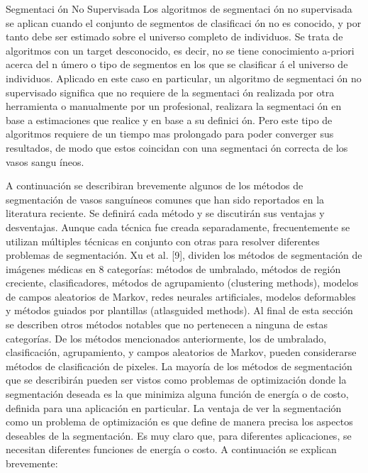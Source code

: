 Segmentaci \'on No Supervisada
Los algoritmos de segmentaci \'on no supervisada se aplican cuando el conjunto de segmentos de clasificaci \'on no es conocido, y por tanto debe ser estimado sobre el universo completo de individuos. Se trata de algoritmos con un target desconocido, es decir, no se tiene conocimiento a-priori acerca del n \'umero o tipo de segmentos en los que se clasificar \'a el universo de individuos. Aplicado en este caso en particular, un algoritmo de segmentaci \'on no supervisado significa que no requiere de la segmentaci \'on realizada por otra herramienta o manualmente por un profesional, realizara  la segmentaci \'on en base a estimaciones que realice y en base a su definici \'on. Pero este tipo de algoritmos requiere de un tiempo mas prolongado para poder converger sus resultados, de modo que estos coincidan con una segmentaci \'on correcta de los vasos sangu \'ineos.


A continuaci\'on se describiran brevemente algunos de los m\'etodos de segmentaci\'on de vasos sangu\'ineos comunes que han sido reportados en la literatura reciente.
Se definir\'a cada m\'etodo y se discutir\'an sus ventajas y desventajas. Aunque cada t\'ecnica fue
creada separadamente, frecuentemente se utilizan m\'ultiples t\'ecnicas en conjunto con otras
para resolver diferentes problemas de segmentaci\'on.
Xu et al. [9], dividen los m\'etodos de segmentaci\'on de im\'agenes m\'edicas en 8
categor\'ias: m\'etodos de umbralado, m\'etodos de regi\'on creciente, clasificadores, m\'etodos
de agrupamiento (clustering methods), modelos de campos aleatorios de Markov, redes
neurales artificiales, modelos deformables y m\'etodos guiados por plantillas (atlasguided
methods). Al final de esta secci\'on se describen otros m\'etodos notables que no pertenecen a
ninguna de estas categor\'ias. De los m\'etodos mencionados anteriormente, los de
umbralado, clasificaci\'on, agrupamiento, y campos aleatorios de Markov, pueden
considerarse m\'etodos de clasificaci\'on de pixeles.
La mayor\'ia de los m\'etodos de segmentaci\'on que se describir\'an pueden ser vistos
como problemas de optimizaci\'on donde la segmentaci\'on deseada es la que minimiza alguna
funci\'on de energ\'ia o de costo, definida para una aplicaci\'on en particular. La ventaja de ver
la segmentaci\'on como un problema de optimizaci\'on es que define de manera precisa los
aspectos deseables de la segmentaci\'on. Es muy claro que, para diferentes aplicaciones, se
necesitan diferentes funciones de energ\'ia o costo. A continuaci\'on se explican brevemente:


